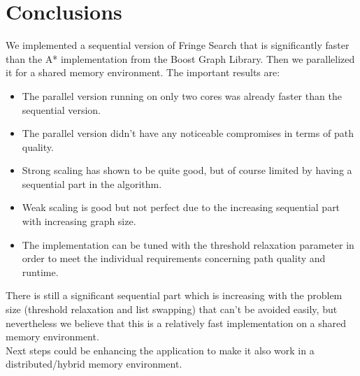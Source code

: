 \documentclass[letterpaper]{article}
\begin{document}
\section{Conclusions}

We implemented a sequential version of Fringe Search that is significantly faster than the A* implementation from the Boost Graph Library. Then we parallelized it for a shared memory environment. The important results are:
\begin{itemize}
\item The parallel version running on only two cores was already faster than the sequential version.
\item The parallel version didn't have any noticeable compromises in terms of path quality.
\item Strong scaling has shown to be quite good, but of course limited by having a sequential part in the algorithm.
\item Weak scaling is good but not perfect due to the increasing sequential part with increasing graph size.
\item The implementation can be tuned with the threshold relaxation parameter in order to meet the individual requirements concerning path quality and runtime.
\end{itemize}
There is still a significant sequential part which is increasing with the problem size (threshold relaxation and list swapping) that can't be avoided easily, but nevertheless we believe that this is a relatively fast implementation on a shared memory environment.\\
Next steps could be enhancing the application to make it also work in a distributed/hybrid memory environment.





\end{document}
